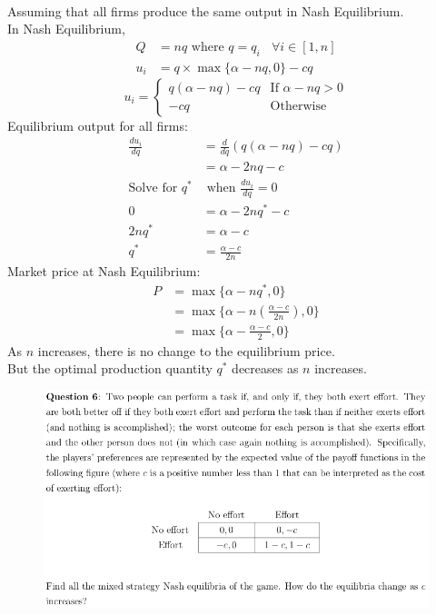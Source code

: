 \documentclass[12pt]{article}
\newenvironment{solution}[2][Solution]{\begin{trivlist}
\item[\hskip \labelsep {\bfseries #1}]}{\end{trivlist}}
\begin{document}
\begin{solution}{}~\\
Assuming that all firms produce the same output in Nash Equilibrium.\\
In Nash Equilibrium,\\
\begin{align*}
Q&=nq\text{ where }q=q_i\ \ \ \ \forall i\in[1,n]\\
u_i&=q\times\max\{\alpha-nq,0\}-cq
\end{align*}
$$u_i=\left\{\begin{array}{ll}
q(\alpha-nq)-cq & \text{If }\alpha-nq>0\\
-cq & \text{Otherwise}
\end{array}\right.$$
Equilibrium output for all firms:\\

\begin{align*}
\frac{du_i}{dq}&=\frac{d}{dq}(q(\alpha-nq)-cq)\\
&=\alpha-2nq-c\\
\text{Solve for }q^*&\text{ when }\frac{du_i}{dq}=0\\
0&=\alpha-2nq^*-c\\
2nq^*&=\alpha-c\\
q^*&=\frac{\alpha-c}{2n}
\end{align*}
Market price at Nash Equilibrium:\\

\begin{align*}
P&=\max\{\alpha-nq^*,0\}\\
&=\max\{\alpha-n(\frac{\alpha-c}{2n}),0\}\\
&=\max\{\alpha-\frac{\alpha-c}{2},0\}
\end{align*}
As $n$ increases, there is no change to the equilibrium price.\\
But the optimal production quantity $q^*$ decreases as $n$ increases.
\end{solution}

\pagebreak

\begin{figure}[h!]
\includegraphics[width=\linewidth]{./assets/201805201652.png}
\end{figure}
\end{document}
